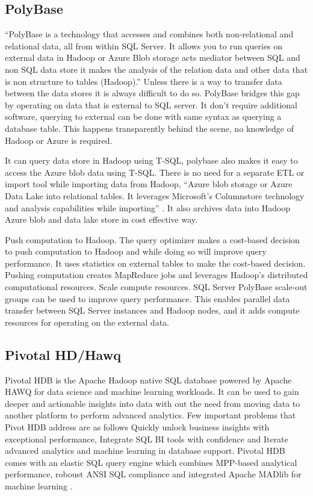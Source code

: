 \subsection{PolyBase}

     ``PolyBase is a technology that accesses and combines both non-relational
     and relational data, all from within SQL Server. It allows you to run 
     queries on external data in Hadoop or Azure Blob storage acts 
     mediator between SQL and non SQL data store it makes the analysis 
     of the relation data and other data that is non structure to 
     tables (Hadoop).'' \cite{www-polybase} Unless there is a way to 
     transfer data between the data stores it is always difficult to do so. 
     PolyBase bridges this gap by operating on data that is external 
     to SQL server. It don’t require additional software, querying to 
     external can be done with same syntax as querying a database table. 
     This happens transparently behind the scene, no knowledge of Hadoop
     or Azure is required.

     It can query data store in Hadoop using T-SQL, polybase also makes 
     it easy to access the Azure blob data using T-SQL. There is no 
     need for a separate ETL or import tool while importing data 
     from Hadoop, ``Azure blob storage or Azure Data Lake into relational 
     tables. It leverages Microsoft’s Columnstore technology and analysis 
     capabilities while importing'' \cite{www-polybase}. It also archives 
     data into Hadoop Azure blob and data lake store in cost effective way. 

     Push computation to Hadoop. The query optimizer makes a cost-based 
     decision to push computation to Hadoop and while doing so will 
     improve query performance. It uses statistics on external tables 
     to make the cost-based decision. Pushing computation creates 
     MapReduce jobs and leverages Hadoop's distributed computational 
     resources. Scale compute resources. SQL Server PolyBase scale-out 
     groups can be used to improve query performance. This enables parallel 
     data transfer between SQL Server instances and Hadoop nodes, 
     and it adds compute resources for operating on the external data.


\subsection{Pivotal HD/Hawq}

     Pivotal HDB is the Apache Hadoop native SQL database powered by
     Apache HAWQ \cite{www-apache-hqwq} for data science and machine
     learning workloads. It can be used to gain deeper and actionable
     insights into data with out the need from moving data to another
     platform to perform advanced analytics. Few important problems
     that Pivot HDB address are as follows Quickly unlock business
     insights with exceptional performance, Integrate SQL BI tools
     with confidence and Iterate advanced analytics and machine
     learning in database support. Pivotal HDB comes with an elastic
     SQL query engine which combines MPP-based analytical performance,
     roboust ANSI SQL compliance and integrated Apache MADlib for
     machine learning \cite{www-pivotalhdb}.
     
